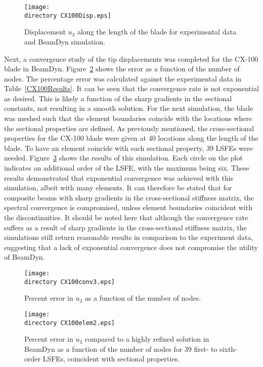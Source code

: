 \documentclass{aiaa-tc}
\def\directory{EPSF/}
\begin{document}
\begin{figure}
\centering
\texttt{[image: \\directory CX100Disp.eps]}
\caption{Displacement $u_3$ along the length of the blade for experimental data and BeamDyn simulation.} 
\label{CX100Disp}
\end{figure}

Next, a convergence study of the tip displacements was completed for the CX-100 blade in BeamDyn. Figure~\ref{CX100conv3} shows the error as a function of the number of nodes. The percentage error was calculated against the experimental data in Table~\ref{CX100Results}. It can be seen that the convergence rate is not exponential as desired. This is likely a function of the sharp gradients in the sectional constants, not resulting in a smooth solution. For the next simulation, the blade was meshed such that the element boundaries coincide with the locations where the sectional properties are defined. As previously mentioned, the cross-sectional properties for the CX-100 blade were given at 40 locations along the length of the blade. To have an element coincide with each sectional property, 39 LSFEs were needed. Figure~\ref{CX100elem2} shows the results of this simulation. Each circle on the plot indicates an additional order of the LSFE, with the maximum being six. These results demonstrated that  exponential convergence was achieved with this simulation, albeit with many elements. It can therefore be stated that for composite beams with sharp gradients in the cross-sectional stiffness matrix, the spectral convergence is compromised, unless element boundaries coincident with the discontinuities. It should be noted here that although the convergence rate suffers as a result of sharp gradients in the cross-sectional stiffness matrix, the simulations still return reasonable results in comparison to the experiment data, suggesting that a lack of exponential convergence does not compromise the utility of BeamDyn.
  

\begin{figure}
\centering
\texttt{[image: \\directory CX100conv3.eps]}
\caption{ Percent error in $u_3$ as a function of the number of nodes.} 
\label{CX100conv3}
\end{figure}

\begin{figure}
\centering
\texttt{[image: \\directory CX100elem2.eps]}
\caption{Percent error in $u_3$ compared to a highly refined solution in BeamDyn as a function of the number of nodes for 39 first- to sixth-order LSFEs, coincident with sectional properties.} 
\label{CX100elem2}
\end{figure}
\end{document}
